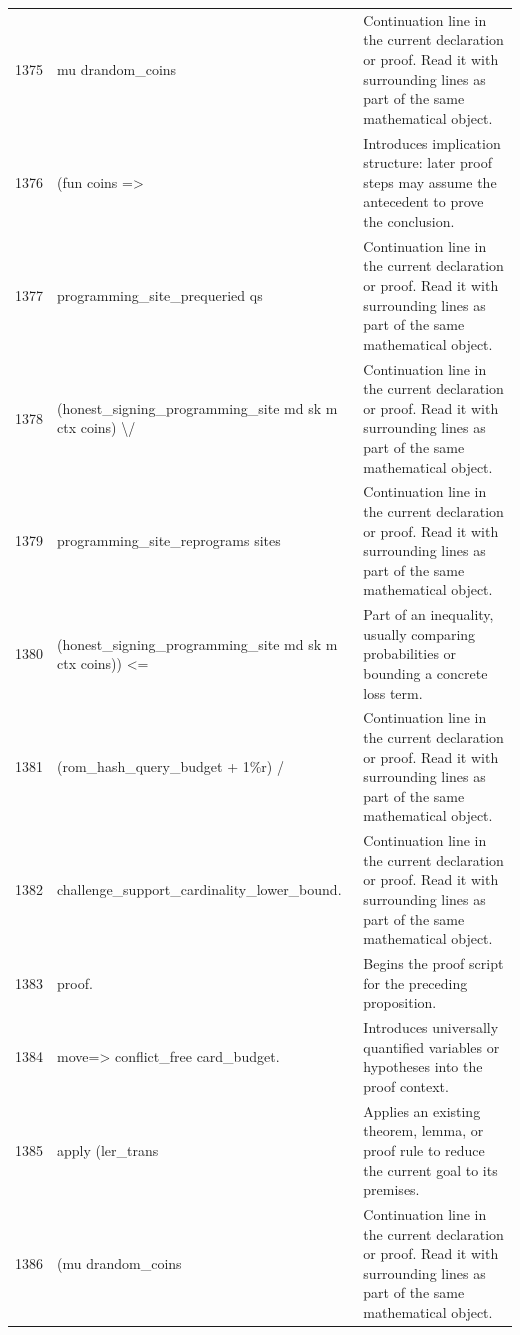 \documentclass[10pt]{article}
\begin{document}
\begin{longtable}{r L{0.53\textwidth} L{0.37\textwidth}}
1375 & {\ttfamily\scriptsize   mu drandom\_coins} & Continuation line in the current declaration or proof.  Read it with surrounding lines as part of the same mathematical object. \\
1376 & {\ttfamily\scriptsize     (fun coins =>} & Introduces implication structure: later proof steps may assume the antecedent to prove the conclusion. \\
1377 & {\ttfamily\scriptsize       programming\_site\_prequeried qs} & Continuation line in the current declaration or proof.  Read it with surrounding lines as part of the same mathematical object. \\
1378 & {\ttfamily\scriptsize         (honest\_signing\_programming\_site md sk m ctx coins) \textbackslash{}/} & Continuation line in the current declaration or proof.  Read it with surrounding lines as part of the same mathematical object. \\
1379 & {\ttfamily\scriptsize       programming\_site\_reprograms sites} & Continuation line in the current declaration or proof.  Read it with surrounding lines as part of the same mathematical object. \\
1380 & {\ttfamily\scriptsize         (honest\_signing\_programming\_site md sk m ctx coins)) <=} & Part of an inequality, usually comparing probabilities or bounding a concrete loss term. \\
1381 & {\ttfamily\scriptsize   (rom\_hash\_query\_budget + 1\%r) /} & Continuation line in the current declaration or proof.  Read it with surrounding lines as part of the same mathematical object. \\
1382 & {\ttfamily\scriptsize     challenge\_support\_cardinality\_lower\_bound.} & Continuation line in the current declaration or proof.  Read it with surrounding lines as part of the same mathematical object. \\
1383 & {\ttfamily\scriptsize proof.} & Begins the proof script for the preceding proposition. \\
1384 & {\ttfamily\scriptsize move=> conflict\_free card\_budget.} & Introduces universally quantified variables or hypotheses into the proof context. \\
1385 & {\ttfamily\scriptsize apply (ler\_trans} & Applies an existing theorem, lemma, or proof rule to reduce the current goal to its premises. \\
1386 & {\ttfamily\scriptsize   (mu drandom\_coins} & Continuation line in the current declaration or proof.  Read it with surrounding lines as part of the same mathematical object. \\

\end{longtable}
\end{document}
